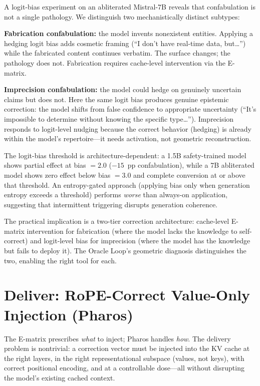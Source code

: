 \documentclass[11pt,a4paper]{article}
\begin{document}
A logit-bias experiment on an abliterated Mistral-7B reveals that confabulation
is not a single pathology. We distinguish two mechanistically distinct subtypes:

\textbf{Fabrication confabulation:} the model invents nonexistent entities.
Applying a hedging logit bias adds cosmetic framing (``I don't have real-time
data, but\ldots'') while the fabricated content continues verbatim. The surface
changes; the pathology does not. Fabrication requires cache-level intervention
via the E-matrix.

\textbf{Imprecision confabulation:} the model could hedge on genuinely uncertain
claims but does not. Here the same logit bias produces genuine epistemic
correction: the model shifts from false confidence to appropriate uncertainty
(``It's impossible to determine without knowing the specific type\ldots'').
Imprecision responds to logit-level nudging because the correct behavior
(hedging) is already within the model's repertoire---it needs activation, not
geometric reconstruction.

The logit-bias threshold is architecture-dependent: a 1.5B safety-trained model
shows partial effect at bias $= 2.0$ ($-15$~pp confabulation), while a 7B
abliterated model shows zero effect below bias $= 3.0$ and complete conversion
at or above that threshold. An entropy-gated approach (applying bias only when
generation entropy exceeds a threshold) performs \emph{worse} than always-on
application, suggesting that intermittent triggering disrupts generation
coherence.

The practical implication is a two-tier correction architecture: cache-level
E-matrix intervention for fabrication (where the model lacks the knowledge to
self-correct) and logit-level bias for imprecision (where the model has the
knowledge but fails to deploy it). The Oracle Loop's geometric diagnosis
distinguishes the two, enabling the right tool for each.

\section{Deliver: RoPE-Correct Value-Only Injection (Pharos)}
\label{sec:deliver}

The E-matrix prescribes \emph{what} to inject; Pharos handles \emph{how}.
The delivery problem is nontrivial: a correction vector must be injected into
the KV cache at the right layers, in the right representational subspace
(values, not keys), with correct positional encoding, and at a controllable
dose---all without disrupting the model's existing cached context.
\end{document}
